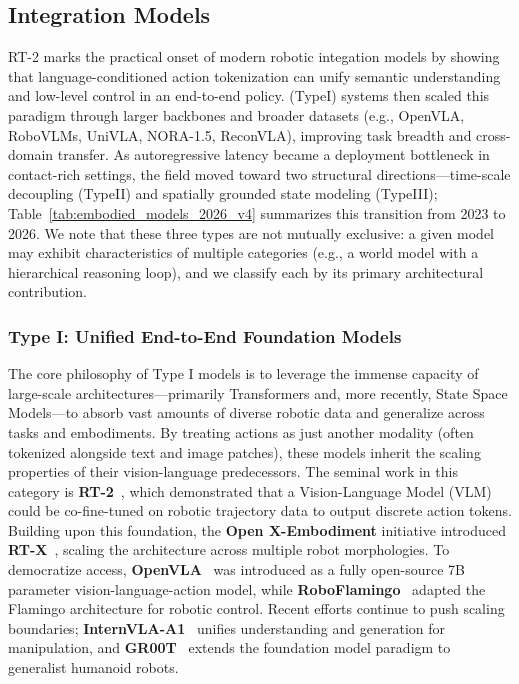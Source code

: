 \documentclass[acmsmall,screen,review,anonymous]{acmart}
\begin{document}
\subsection{Integration Models}

RT-2\cite{brohan2023rt2} marks the practical onset of modern robotic integation models by showing that language-conditioned action tokenization can unify semantic understanding and low-level control in an end-to-end policy.
(TypeI) systems then scaled this paradigm through larger backbones and broader datasets (e.g., OpenVLA, RoboVLMs, UniVLA, NORA-1.5, ReconVLA), improving task breadth and cross-domain transfer\cite{kim2024openvla,li2026matters,bu2025univla,hung2025nora15,song2025reconvla}.
As autoregressive latency became a deployment bottleneck in contact-rich settings, the field moved toward two structural directions—time-scale decoupling (TypeII) and spatially grounded state modeling (TypeIII)\cite{belkhale2024rth,chen2025fis,zhen20243dvla,qu2025spatialvla}; Table~\ref{tab:embodied_models_2026_v4} summarizes this transition from 2023 to 2026. We note that these three types are not mutually exclusive: a given model may exhibit characteristics of multiple categories (e.g., a world model with a hierarchical reasoning loop), and we classify each by its primary architectural contribution.

\subsubsection{Type I\@: Unified End-to-End Foundation Models}

The core philosophy of Type I models is to leverage the immense capacity of large-scale architectures---primarily Transformers and, more recently, State Space Models---to absorb vast amounts of diverse robotic data and generalize across tasks and embodiments. By treating actions as just another modality (often tokenized alongside text and image patches), these models inherit the scaling properties of their vision-language predecessors. The seminal work in this category is \textbf{RT-2}~\cite{brohan2023rt2}, which demonstrated that a Vision-Language Model (VLM) could be co-fine-tuned on robotic trajectory data to output discrete action tokens. Building upon this foundation, the \textbf{Open X-Embodiment} initiative introduced \textbf{RT-X}~\cite{padalkar2023open}, scaling the architecture across multiple robot morphologies. To democratize access, \textbf{OpenVLA}~\cite{kim2024openvla} was introduced as a fully open-source 7B parameter vision-language-action model, while \textbf{RoboFlamingo}~\cite{li2023roboflamingo} adapted the Flamingo architecture for robotic control. Recent efforts continue to push scaling boundaries; \textbf{InternVLA-A1}~\cite{cai2026internvlaa1} unifies understanding and generation for manipulation, and \textbf{GR00T}~\cite{nvidia2025grootn1} extends the foundation model paradigm to generalist humanoid robots.
\end{document}
